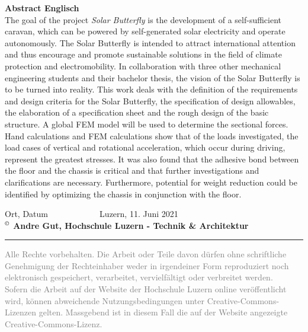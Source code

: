 \textbf{Abstract Englisch}\\
The goal of the project \emph{Solar Butterfly} is the development of a self-sufficient caravan, which can be powered by self-generated solar electricity and operate autonomously. The Solar Butterfly is intended to attract international attention and thus encourage and promote sustainable solutions in the field of climate protection and electromobility. In collaboration with three
other mechanical engineering students and their bachelor thesis, the vision of the Solar Butterfly is to be turned into reality.
This work deals with the definition of the requirements and design criteria for the Solar Butterfly, the specification of design allowables, the elaboration of a specification sheet and the rough design of the basic structure. A global FEM model will be used to determine the sectional forces.
Hand calculations and FEM calculations show that of the loads investigated, the load cases of vertical and rotational acceleration, which occur during driving, represent the greatest stresses. It was also found that the adhesive bond between the floor and the chassis is critical and that further investigations and clarifications are necessary. Furthermore, potential for weight reduction could be identified by optimizing the chassis in conjunction with the floor.

\vspace{2cm}
Ort, Datum $\;\;\;\;\;\;\;\;\;\;\;\;\;\;\;\;\;\;\;\;$ Luzern, 11. Juni 2021\\
\textbf{{\small $^\copyright$} Andre Gut, Hochschule Luzern - Technik \& Architektur}

\vspace*{\fill}

\noindent
{\color{gray} \rule{\linewidth}{0.5px} }
\begin{footnotesize}
  \textcolor{gray}{Alle Rechte vorbehalten. Die Arbeit oder Teile davon dürfen ohne schriftliche Genehmigung der Rechteinhaber weder in irgendeiner Form reproduziert noch elektronisch gespeichert, verarbeitet, vervielfältigt oder verbreitet werden.}\\
  \textcolor{gray}{Sofern die Arbeit auf der Website der Hochschule Luzern online veröffentlicht wird, können abweichende Nutzungsbedingungen unter Creative-Commons-Lizenzen gelten. Massgebend ist in diesem Fall die auf der Website angezeigte Creative-Commons-Lizenz.}
\end{footnotesize}
\newpage
